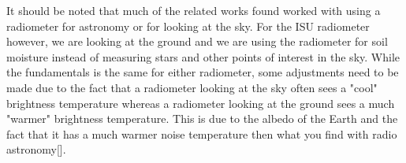 It should be noted that much of the related works found worked with using a radiometer for astronomy or for looking at the sky.  For the ISU radiometer however, we are looking at the ground and we are using the radiometer for soil moisture instead of measuring stars and other points of interest in the sky.  While the fundamentals is the same for either radiometer, some adjustments need to be made due to the fact that a radiometer looking at the sky often sees a "cool" brightness temperature whereas a radiometer looking at the ground sees a much "warmer" brightness temperature.  This is due to the albedo of the Earth and the fact that it has a much warmer noise temperature then what you find with radio astronomy[\cite{Tiuri}].

